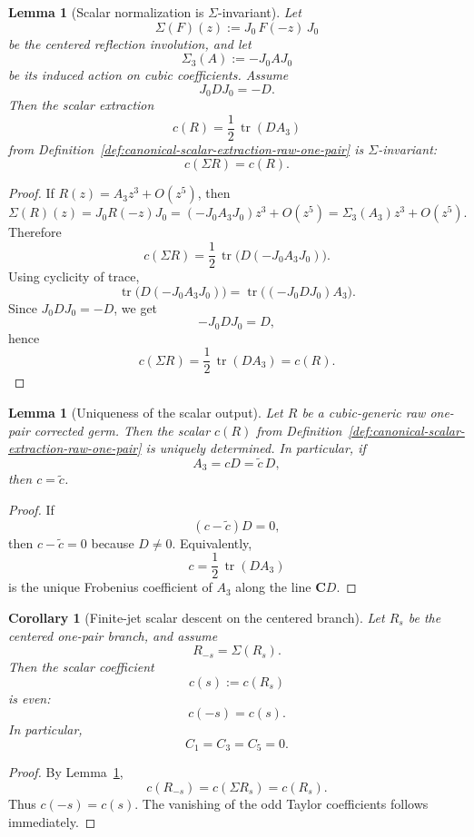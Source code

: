 \documentclass[11pt,a4paper]{amsart}
\theoremstyle{plain}
\newtheorem{lemma}[theorem]{Lemma}
\newtheorem{corollary}[theorem]{Corollary}
\theoremstyle{definition}
\begin{document}
\begin{lemma}[Scalar normalization is $\Sigma$-invariant]
\label{lem:scalar-normalization-sigma-invariant}
Let
\[
\Sigma(F)(z):=J_0\,F(-z)\,J_0
\]
be the centered reflection involution, and let
\[
\Sigma_3(A):=-J_0 A J_0
\]
be its induced action on cubic coefficients. Assume
\[
J_0 D J_0=-D.
\]
Then the scalar extraction
\[
c(R)=\frac12\,\operatorname{tr}(D A_3)
\]
from Definition~\ref{def:canonical-scalar-extraction-raw-one-pair} is
$\Sigma$-invariant:
\[
c(\Sigma R)=c(R).
\]
\end{lemma}

\begin{proof}
If $R(z)=A_3 z^3+O(z^5)$, then
\[
\Sigma(R)(z)=J_0R(-z)J_0
          =(-J_0A_3J_0)z^3+O(z^5)
          =\Sigma_3(A_3)z^3+O(z^5).
\]
Therefore
\[
c(\Sigma R)
=
\frac12\,\operatorname{tr}\!\bigl(D(-J_0A_3J_0)\bigr).
\]
Using cyclicity of trace,
\[
\operatorname{tr}\!\bigl(D(-J_0A_3J_0)\bigr)
=
\operatorname{tr}\!\bigl((-J_0DJ_0)A_3\bigr).
\]
Since $J_0DJ_0=-D$, we get
\[
-J_0DJ_0=D,
\]
hence
\[
c(\Sigma R)=\frac12\,\operatorname{tr}(D A_3)=c(R).
\]
\end{proof}

\begin{lemma}[Uniqueness of the scalar output]
\label{lem:scalar-output-unique}
Let $R$ be a cubic-generic raw one-pair corrected germ. Then the scalar
$c(R)$ from
Definition~\ref{def:canonical-scalar-extraction-raw-one-pair} is uniquely
determined. In particular, if
\[
A_3=cD=\widetilde c\,D,
\]
then $c=\widetilde c$.
\end{lemma}

\begin{proof}
If
\[
(c-\widetilde c)D=0,
\]
then $c-\widetilde c=0$ because $D\neq 0$. Equivalently,
\[
c=\frac12\,\operatorname{tr}(D A_3)
\]
is the unique Frobenius coefficient of $A_3$ along the line $\mathbf C D$.
\end{proof}

\begin{corollary}[Finite-jet scalar descent on the centered branch]
\label{cor:finite-jet-scalar-descent-centered-branch}
Let $R_s$ be the centered one-pair branch, and assume
\[
R_{-s}=\Sigma(R_s).
\]
Then the scalar coefficient
\[
c(s):=c(R_s)
\]
is even:
\[
c(-s)=c(s).
\]
In particular,
\[
C_1=C_3=C_5=0.
\]
\end{corollary}

\begin{proof}
By Lemma~\ref{lem:scalar-normalization-sigma-invariant},
\[
c(R_{-s})=c(\Sigma R_s)=c(R_s).
\]
Thus $c(-s)=c(s)$. The vanishing of the odd Taylor coefficients follows
immediately.
\end{proof}
\end{document}
